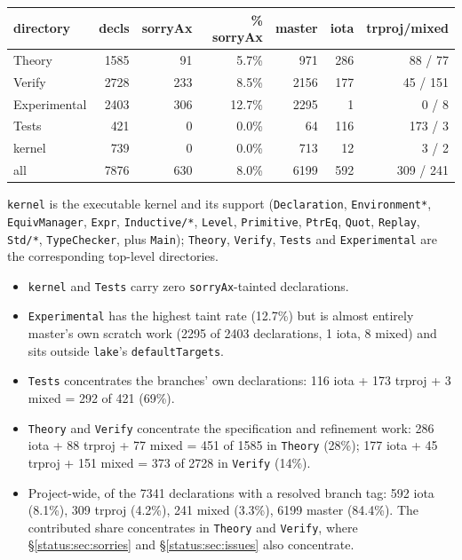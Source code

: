 \begin{center}
\begin{tabular}{lrrrrrr}
\toprule
directory & decls & sorryAx & \% sorryAx & master & iota & trproj/mixed \\
\midrule
Theory & 1585 & 91 & 5.7\% & 971 & 286 & 88 / 77 \\
Verify & 2728 & 233 & 8.5\% & 2156 & 177 & 45 / 151 \\
Experimental & 2403 & 306 & 12.7\% & 2295 & 1 & 0 / 8 \\
Tests & 421 & 0 & 0.0\% & 64 & 116 & 173 / 3 \\
kernel & 739 & 0 & 0.0\% & 713 & 12 & 3 / 2 \\
\midrule
all & 7876 & 630 & 8.0\% & 6199 & 592 & 309 / 241 \\
\bottomrule
\end{tabular}\par\smallskip
\end{center}

\texttt{kernel} is the executable kernel and its support (\texttt{Declaration}, \texttt{Environment*}, \texttt{EquivManager}, \texttt{Expr}, \texttt{Inductive/*}, \texttt{Level}, \texttt{Primitive}, \texttt{PtrEq}, \texttt{Quot}, \texttt{Replay}, \texttt{Std/*}, \texttt{TypeChecker}, plus \texttt{Main}); \texttt{Theory}, \texttt{Verify}, \texttt{Tests} and \texttt{Experimental} are the corresponding top-level directories.

\begin{itemize}
\item \texttt{kernel} and \texttt{Tests} carry zero \texttt{sorryAx}-tainted declarations.
\item \texttt{Experimental} has the highest taint rate (12.7\%) but is almost entirely master's own scratch work (2295 of 2403 declarations, 1 iota, 8 mixed) and sits outside \texttt{lake}'s \texttt{defaultTargets}.
\item \texttt{Tests} concentrates the branches' own declarations: 116 iota + 173 trproj + 3 mixed = 292 of 421 (69\%).
\item \texttt{Theory} and \texttt{Verify} concentrate the specification and refinement work: 286 iota + 88 trproj + 77 mixed = 451 of 1585 in \texttt{Theory} (28\%); 177 iota + 45 trproj + 151 mixed = 373 of 2728 in \texttt{Verify} (14\%).
\item Project-wide, of the 7341 declarations with a resolved branch tag: 592 iota (8.1\%), 309 trproj (4.2\%), 241 mixed (3.3\%), 6199 master (84.4\%). The contributed share concentrates in \texttt{Theory} and \texttt{Verify}, where \S\ref{status:sec:sorries} and \S\ref{status:sec:issues} also concentrate.
\end{itemize}

